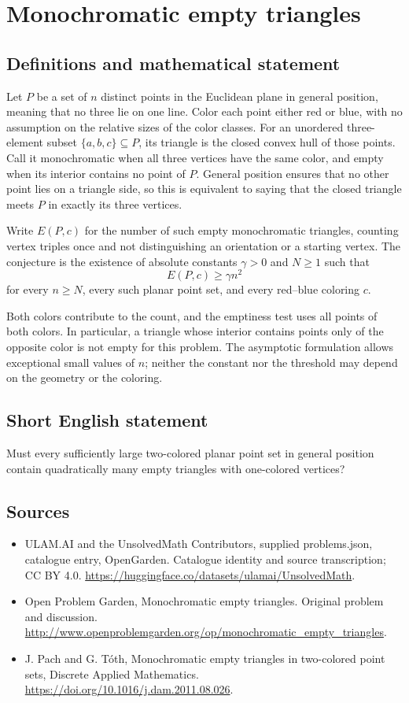 \documentclass[11pt,a4paper]{article}
\begin{document}
\section*{Monochromatic empty triangles}\label{statement}

\subsection{Definitions and mathematical statement}
Let $P$ be a set of $n$ distinct points in the Euclidean plane in general position, meaning that no three lie on one line. Color each point either red or blue, with no assumption on the relative sizes of the color classes. For an unordered three-element subset $\{a,b,c\}\subseteq P$, its triangle is the closed convex hull of those points. Call it monochromatic when all three vertices have the same color, and empty when its interior contains no point of $P$. General position ensures that no other point lies on a triangle side, so this is equivalent to saying that the closed triangle meets $P$ in exactly its three vertices.

Write $E(P,c)$ for the number of such empty monochromatic triangles, counting vertex triples once and not distinguishing an orientation or a starting vertex. The conjecture is the existence of absolute constants $\gamma>0$ and $N\ge1$ such that
\[
 E(P,c)\ge\gamma n^2
\]
for every $n\ge N$, every such planar point set, and every red--blue coloring $c$.

Both colors contribute to the count, and the emptiness test uses all points of both colors. In particular, a triangle whose interior contains points only of the opposite color is not empty for this problem. The asymptotic formulation allows exceptional small values of $n$; neither the constant nor the threshold may depend on the geometry or the coloring.
\subsection{Short English statement}
Must every sufficiently large two-colored planar point set in general position contain quadratically many empty triangles with one-colored vertices?
\subsection{Sources}
\begin{itemize}
\item[S1] ULAM.AI and the UnsolvedMath Contributors, supplied problems.json, catalogue entry, OpenGarden. Catalogue identity and source transcription; CC BY 4.0.
\url{https://huggingface.co/datasets/ulamai/UnsolvedMath}.
\item[S2] Open Problem Garden, Monochromatic empty triangles. Original problem and discussion.
\url{http://www.openproblemgarden.org/op/monochromatic_empty_triangles}.
\item[S3] J. Pach and G. Tóth, Monochromatic empty triangles in two-colored point sets, Discrete Applied Mathematics.
\url{https://doi.org/10.1016/j.dam.2011.08.026}.
\end{itemize}
\end{document}
